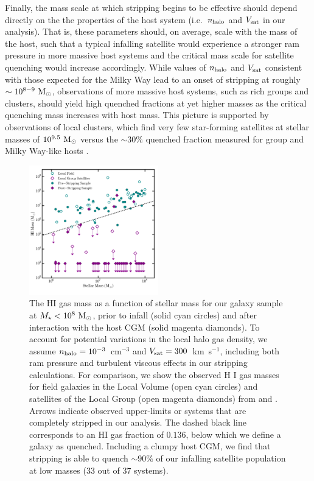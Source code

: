 \documentclass[usenatbib]{mn2e}
\newcommand{\mstar}{{M}_{\star}}
\newcommand{\msun}{{\rm M}_{\odot}}
\begin{document}
Finally, the mass scale at which stripping begins to be effective
should depend directly on the the properties of the host system
(i.e.~$n_{\rm halo}$ and $V_{\rm sat}$ in our analysis).
%
That is, these parameters should, on average, scale with the mass of
the host, such that a typical infalling satellite would experience a
stronger ram pressure in more massive host systems and the critical
mass scale for satellite quenching would increase accordingly.
%
While values of $n_{\rm halo}$ and $V_{\rm sat}$ consistent with those
expected for the Milky Way lead to an onset of stripping at roughly
$\sim10^{8-9}~\msun$, observations of more massive host systems, such
as rich groups and clusters, should yield high quenched fractions at
yet higher masses as the critical quenching mass increases with host
mass.
%
This picture is supported by observations of local clusters, which
find very few star-forming satellites at stellar masses of
$10^{9.5}~\msun$ versus the $\sim 30\%$ quenched fraction measured for
group and Milky Way-like hosts \citep[e.g.][]{smith12, boselli14b,
  phillips15a, sj16}.



\begin{figure}
 \centering
 \hspace*{-0.2in}
   \includegraphics[width=0.5\textwidth]{f7.pdf}
   \caption{The H{\scriptsize I} gas mass as a function of stellar
     mass for our galaxy sample at $\mstar < 10^{8}~\msun$, prior to
     infall (solid cyan circles) and after interaction with the host
     CGM (solid magenta diamonds). To account for potential variations
     in the local halo gas density, we assume $n_{\rm halo} =
     10^{-3}$~cm$^{-3}$ and $V_{\rm sat} = 300$~km~s$^{-1}$, including
     both ram pressure and turbulent viscous effects in our stripping
     calculations. For comparison, we show the observed H{\scriptsize
       I} gas masses for field galaxies in the Local Volume (open cyan
     circles) and satellites of the Local Group (open magenta
     diamonds) from \citet{mcconnachie12} and
     \citet{spekkens14}. Arrows indicate observed upper-limits or
     systems that are completely stripped in our analysis. The dashed
     black line corresponds to an H{\scriptsize I} gas fraction of
     $0.136$, below which we define a galaxy as quenched. Including a
     clumpy host CGM, we find that stripping is able to quench
     $\sim90\%$ of our infalling satellite population at low masses
     ($33$ out of $37$ systems).}
 \label{fig:gasfrac}
\end{figure}
\end{document}
